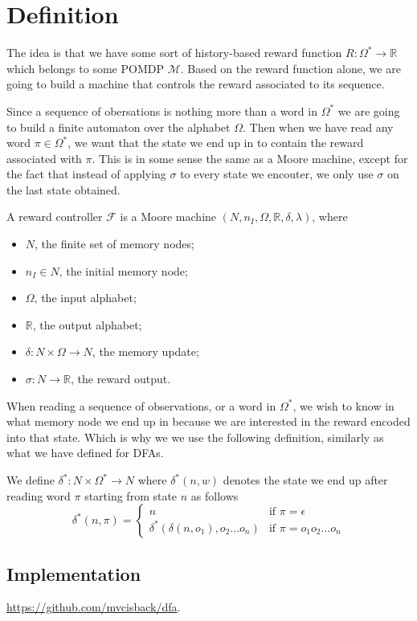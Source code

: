 \section{Definition}

The idea is that we have some sort of history-based reward function $R:\Omega^*\to\mathbb{R}$ which belongs to some POMDP $\mathcal{M}$. Based on the reward function alone, we are going to build a machine that controls the reward associated to its sequence. 

Since a sequence of obersations is nothing more than a word in $\Omega^*$ we are going to build a finite automaton over the alphabet $\Omega$. Then when we have read any word $\pi\in\Omega^*$, we want that the state we end up in to contain the reward associated with $\pi$. This is in some sense the same as a Moore machine, except for the fact that instead of applying $\sigma$ to every state we encouter, we only use $\sigma$ on the last state obtained. 

\begin{definition}
	A reward controller $\mathcal{F}$ is a Moore machine $(N,n_I, \Omega, \mathbb{R}, \delta, \lambda)$, where
	\begin{itemize}
		\item $N$, the finite set of memory nodes;
		\item $n_I\in N$, the initial memory node;
		\item $\Omega$, the input alphabet;
		\item $\mathbb{R}$, the output alphabet;
		\item $\delta: N \times \Omega \to N$, the memory update;
		\item $\sigma: N \to \mathbb{R}$, the reward output. 
	\end{itemize}
\end{definition}

When reading a sequence of observations, or a word in $\Omega^*$, we wish to know in what memory node we end up in because we are interested in the reward encoded into that state. Which is why we we use the following definition, similarly as what we have defined for DFAs.

\begin{definition}
We define $\delta^*:N\times\Omega^*\to N$ where $\delta^*(n,w)$ denotes the state we end up after reading word $\pi$ starting from state $n$ as follows
\begin{equation*}
\delta^*(n,\pi)=\begin{cases}
	n &\text{if } \pi=\epsilon \\
	\delta^*(\delta(n,o_1),o_2\dots o_n) & \text{if } \pi=o_1 o_2\dots o_n
	\end{cases}
\end{equation*}
\label{d:delta_star_rc}
\end{definition}

\subsection*{Implementation}
\url{https://github.com/mvcisback/dfa}.
